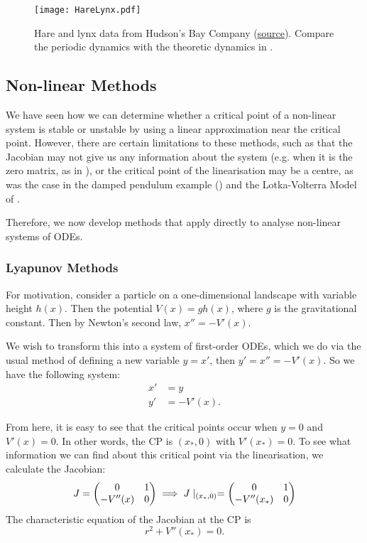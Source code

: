 \begin{figure}[!ht]
	\centering
	\texttt{[image: HareLynx.pdf]}
	\caption{Hare and lynx data from Hudson's Bay Company (\href{https://www2.nau.edu/lrm22/lessons/predator_prey/predator_prey.html}{source}). Compare the periodic dynamics with the theoretic dynamics in .}
	\label{fig:harelynx}
\end{figure}

\subsection{Non-linear Methods}

We have seen how we can determine whether a critical point of a non-linear system is stable or unstable by using a linear approximation near the critical point. However, there are certain limitations to these methods, such as that the Jacobian may not give us any information about the system (e.g. when it is the zero matrix, as in ), or the critical point of the linearisation may be a centre, as was the case in the damped pendulum example () and the Lotka-Volterra Model of .

Therefore, we now develop methods that apply directly to analyse non-linear systems of ODEs.

\subsubsection{Lyapunov Methods}

For motivation, consider a particle on a one-dimensional landscape with variable height $h(x)$. Then the potential $V(x) = gh(x)$, where $g$ is the gravitational constant. Then by Newton's second law, $x'' = -V'(x)$.

We wish to transform this into a system of first-order ODEs, which we do via the usual method of defining a new variable $y=x'$, then $y' = x'' = -V'(x)$. So we have the following system:
\begin{align*}
	x' &= y \\
	y' &= -V'(x).
\end{align*}

From here, it is easy to see that the critical points occur when $y=0$ and $V'(x)=0$. In other words, the CP is $(x_*, 0)$ with $V'(x_*) = 0$. To see what information we can find about this critical point via the linearisation, we calculate the Jacobian:
\[
J = \begin{pmatrix}0 & 1 \\ -V''(x) & 0\end{pmatrix} \implies J\mid_{(x_*,0)} = \begin{pmatrix}0 & 1 \\ -V''(x_*) & 0\end{pmatrix}
\]
The characteristic equation of the Jacobian at the CP is
\[
r^2 + V''(x_*) = 0.
\]

